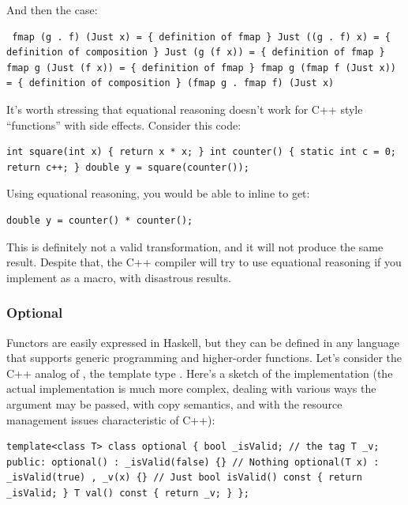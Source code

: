 And then the  case:

\begin{verbatim}
 fmap (g . f) (Just x) = { definition of fmap } Just ((g . f) x) = { definition of composition } Just (g (f x)) = { definition of fmap } fmap g (Just (f x)) = { definition of fmap } fmap g (fmap f (Just x)) = { definition of composition } (fmap g . fmap f) (Just x)
\end{verbatim}

It's worth stressing that equational reasoning doesn't work for C++
style ``functions'' with side effects. Consider this code:

\begin{verbatim}
int square(int x) { return x * x; } int counter() { static int c = 0; return c++; } double y = square(counter());
\end{verbatim}

Using equational reasoning, you would be able to inline 
to get:

\begin{verbatim}
double y = counter() * counter();
\end{verbatim}

This is definitely not a valid transformation, and it will not produce
the same result. Despite that, the C++ compiler will try to use
equational reasoning if you implement  as a macro, with
disastrous results.

\subsubsection{Optional}\label{optional}

Functors are easily expressed in Haskell, but they can be defined in any
language that supports generic programming and higher-order functions.
Let's consider the C++ analog of , the template type
. Here's a sketch of the implementation (the actual
implementation is much more complex, dealing with various ways the
argument may be passed, with copy semantics, and with the resource
management issues characteristic of C++):

\begin{verbatim}
template<class T> class optional { bool _isValid; // the tag T _v; public: optional() : _isValid(false) {} // Nothing optional(T x) : _isValid(true) , _v(x) {} // Just bool isValid() const { return _isValid; } T val() const { return _v; } };
\end{verbatim}

